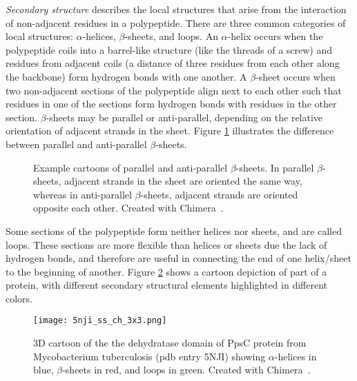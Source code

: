 \textit{Secondary structure} describes the local structures that arise from the interaction of non-adjacent residues in a polypeptide.
There are three common categories of local structures: $\alpha$-helices, $\beta$-sheets, and loops.
An  $\alpha$-helix occurs when the polypeptide coils into a barrel-like structure (like the threads of a screw) and residues from adjacent coils (a distance of three residues from each other along the backbone) form hydrogen bonds with one another.
A $\beta$-sheet occurs when two non-adjacent sections of the polypeptide align next to each other such that residues in one of the sections form hydrogen bonds with residues in the other section.
$\beta$-sheets may be parallel or anti-parallel, depending on the relative orientation of adjacent strands in the sheet.
Figure \ref{fig:beta} illustrates the difference between parallel and anti-parallel $\beta$-sheets.
\begin{figure}
	\centering
	\hfill
	\caption{Example cartoons of parallel and anti-parallel $\beta$-sheets. In parallel $\beta$-sheets, adjacent strands in the sheet are oriented the same way, whereas in anti-parallel $\beta$-sheets, adjacent strands are oriented opposite each other. Created with Chimera~\cite{pettersen2004}.}
	\label{fig:beta}
\end{figure}
Some sections of the polypeptide form neither helices nor sheets, and are called loops.
These sections are more flexible than helices or sheets due the lack of hydrogen bonds, and therefore are useful in connecting the end of one helix/sheet to the beginning of another.
Figure \ref{fig:5nji_ss} shows a cartoon depiction of part of a protein, with different secondary structural elements highlighted in different colors.
	
\begin{figure}
	\centering
	\texttt{[image: 5nji\_ss\_ch\_3x3.png]}
	\caption{3D cartoon of the the dehydratase domain of PpsC protein from Mycobacterium tuberculosis (pdb entry 5NJI) showing $\alpha$-helices in blue, $\beta$-sheets in red, and loops in green. Created with Chimera~\cite{pettersen2004}.}
	\label{fig:5nji_ss}
\end{figure}

